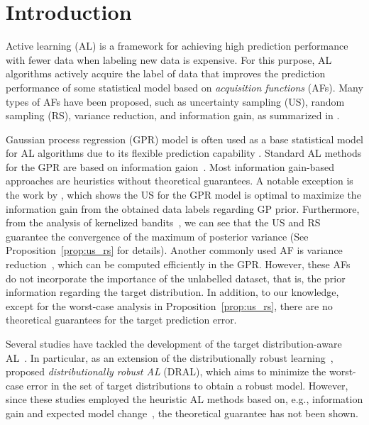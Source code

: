 \section{Introduction}
\label{sec:intro}



Active learning (AL) \citep{settles2009-active} is a framework for achieving high prediction performance with fewer data when labeling new data is expensive. 
%
For this purpose, AL algorithms actively acquire the label of data that improves the prediction performance of some statistical model based on \emph{acquisition functions} (AFs).
%
Many types of AFs have been proposed, such as uncertainty sampling (US), random sampling (RS), variance reduction, and information gain, as summarized in \citet{settles2009-active}.




Gaussian process regression (GPR) model \citep{Rasmussen2005-Gaussian} is often used as a base statistical model for AL algorithms due to its flexible prediction capability \citep{Seo2000gaussian,yu2006active,Guestrin2005-near,krause2008-near,hoang2014nonmyopic}.
%
Standard AL methods for the GPR are based on information gaion~\citep{Guestrin2005-near,krause2008-near,kirsch2021test,kirsch2022unifying,bickford2023-prediction}.
%
Most information gain-based approaches are heuristics without theoretical guarantees.
%
A notable exception is the work by \citet{Guestrin2005-near,krause2008-near}, which shows the US for the GPR model is optimal to maximize the information gain from the obtained data labels regarding GP prior.
%
Furthermore, from the analysis of kernelized bandits~\citep[e.g., ][]{Srinivas2010-Gaussian,salgia2024random}, we can see that the US and RS guarantee the convergence of the maximum of posterior variance (See Proposition~\ref{prop:us_rs} for details).
%
Another commonly used AF is variance reduction~\citep{Seo2000gaussian,yu2006active,Shoham2023experimental}, which can be computed efficiently in the GPR.
%
However, these AFs do not incorporate the importance of the unlabelled dataset, that is, the prior information regarding the target distribution.
%
In addition, to our knowledge, except for the worst-case analysis in Proposition~\ref{prop:us_rs}, there are no theoretical guarantees for the target prediction error.


Several studies have tackled the development of the target distribution-aware AL~\citep{kirsch2021test,kirsch2022unifying,bickford2023-prediction}.
%
In particular, as an extension of the distributionally robust learning~\citep{chen2020distributionally}, \citet{frogner2021incorporating} proposed \emph{distributionally robust AL} (DRAL), which aims to minimize the worst-case error in the set of target distributions to obtain a robust model.
%
However, since these studies employed the heuristic AL methods based on, e.g., information gain and expected model change~\citep{settles2009-active}, the theoretical guarantee has not been shown.


